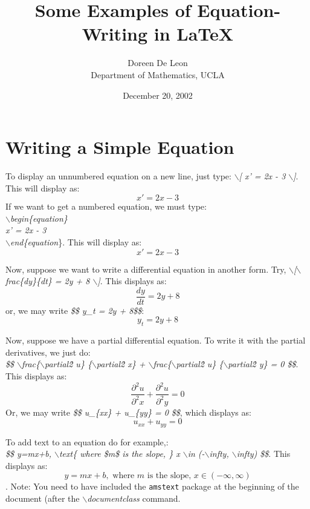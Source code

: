 \documentclass{article}
\begin{document}
\title{Some Examples of Equation-Writing in \LaTeX}
\author{Doreen De Leon\\Department of Mathematics, UCLA}
\date{December 20, 2002}
\maketitle

\section{Writing a Simple Equation}
\label{sec:simple}
\setcounter{equation}{0} %

To display an unnumbered equation on a new line, just type:
\emph{$\backslash$[ x' = 2x - 3 $\backslash$]}.  This will display as:
\[ x' = 2x - 3 \]
If we want to get a numbered equation, we must type:\\
\emph{$\backslash$begin\{equation\}\\x' = 2x - 3\\$\backslash$end\{equation}\}.
This will display as:
\begin{equation}
x' = 2x - 3
\end{equation}

Now, suppose we want to write a differential equation in another form.
Try, \emph{$\backslash$[$ \backslash$frac\{dy\}\{dt\} = 2y + 8 $\backslash$]}.
This displays as:
\[ \frac{dy}{dt} = 2y + 8 \]
or, we may write \emph{\$\$ y\_t = 2y + 8\$\$}:
$$ y_t = 2y + 8 $$

Now, suppose we have a partial differential equation.
To write it with the partial derivatives, we just do:\\
\emph{\$\$ $\backslash$frac\{$\backslash$partial\^2 u\}
    \{$\backslash$partial\^2 x\} + $\backslash$frac\{$\backslash$partial\^2 u\}
    \{$\backslash$partial\^2 y\} = 0 \$\$}.
This displays as:
$$ \frac{\partial^2 u}{\partial^2 x} +
\frac{\partial^2 u}{\partial^2 y} = 0 $$
Or, we may write \emph{\$\$ u\_\{xx\} + u\_\{yy\} = 0 \$\$}, which displays as:
$$ u_{xx} + u_{yy} = 0 $$

To add text to an equation do for example,:\\
\emph{\$\$ y=mx+b, $\backslash$text\{ where \$m\$ is the slope, \} x
      $\backslash$in (-$\backslash$infty, $\backslash$infty) \$\$}.
This displays as:
$$ y=mx+b, \text{ where $m$ is the slope, } x \in (-\infty, \infty) $$.
Note: You need to have included the \texttt{amstext} package at the beginning
of the document (after the \emph{$\backslash$documentclass} command.
\end{document}
